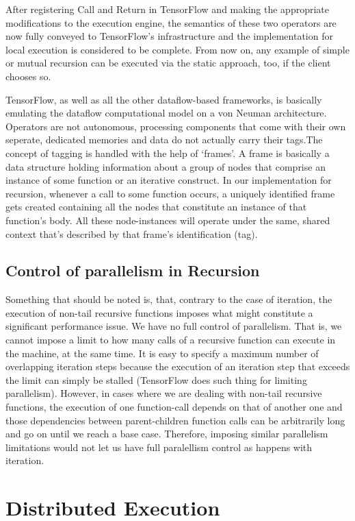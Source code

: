 \documentclass[ack,preface]{dithesis}
\begin{document}
After registering Call and Return in TensorFlow and making the appropriate modifications to the execution engine, the semantics of these two operators are now fully conveyed to TensorFlow's infrastructure and the implementation for local execution is considered to be complete. From now on, any example of simple or mutual recursion can be executed via the static approach, too, if the client chooses so.


TensorFlow, as well as all the other dataflow-based frameworks, is basically emulating the dataflow computational model on a von Neuman architecture. Operators are not autonomous, processing components that come with their own seperate, dedicated memories and data do not actually carry their tags.The concept of tagging is handled with the help of \lq frames\rq .
A frame is basically a data structure holding information about a group of nodes that comprise an instance of some function or an iterative construct.
In our implementation for recursion, whenever a call to some function occurs, a uniquely identified frame gets created containing all the nodes that constitute an instance of that function's body. All these node-instances will operate under the same, shared context that's described by that frame's identification (tag).


    \subsection{Control of parallelism in Recursion}
Something that should be noted is, that, contrary to the case of iteration, the execution of non-tail recursive functions imposes what might constitute a significant performance issue.
We have no full control of parallelism. That is, we cannot impose a limit to how many calls of a recursive function can execute in the machine, at the same time.
Ιt is easy to specify a maximum number of overlapping iteration steps  because the execution of an iteration step that exceeds the limit can simply be stalled (TensorFlow does such thing for limiting parallelism). However, in cases where we are dealing with non-tail recursive functions, the execution of one function-call depends on that of another one and those dependencies between parent-children function calls can be arbitrarily long and go on until we reach a base case. Therefore, imposing similar parallelism limitations would not let us have full paralellism control as happens with iteration.


    \section{Distributed Execution}
\end{document}
